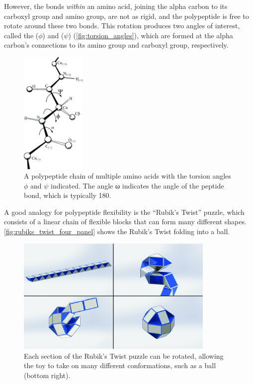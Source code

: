However, the bonds \textit{within} an amino acid, joining the alpha carbon to its carboxyl group and amino group, are not as rigid, and the polypeptide is free to rotate around these two bonds. This rotation produces two angles of interest, called the  ($\phi$) and  ($\psi$) (\autoref{fig:torsion_angles}), which are formed at the alpha carbon's connections to its amino group and carboxyl group, respectively.\\

\begin{figure}[h]
	\centering
	\mySfFamily
	\includegraphics[width = 0.28\textwidth]{../images_CMYK/torsion_angles}
	\caption{A polypeptide chain of multiple amino acids with the torsion angles $\phi$ and $\psi$ indicated. The angle ω indicates the angle of the peptide bond, which is typically 180\textdegree.}
	\label{fig:torsion_angles}
\end{figure}

A good analogy for polypeptide flexibility is the ``Rubik's Twist'' puzzle, which consists of a linear chain of flexible blocks that can form many different shapes. \autoref{fig:rubiks_twist_four_panel} shows the Rubik's Twist folding into a ball.

\begin{figure}[h]
	\centering
	\mySfFamily
	\includegraphics[width = 0.85\textwidth]{../images_CMYK/rubiks_twist_four_panel}
	\caption{Each section of the Rubik's Twist puzzle can be rotated, allowing the toy to take on many different conformations, such as a ball (bottom right).}
	\label{fig:rubiks_twist_four_panel}
\end{figure}

